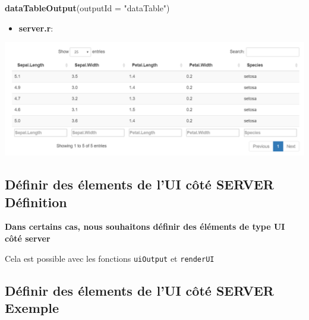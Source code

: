 \documentclass[
]{article}
\newenvironment{Shaded}{\begin{snugshade}}{\end{snugshade}}
\newcommand{\AttributeTok}[1]{\textcolor[rgb]{0.13,0.29,0.53}{#1}}
\newcommand{\FunctionTok}[1]{\textcolor[rgb]{0.13,0.29,0.53}{\textbf{#1}}}
\newcommand{\NormalTok}[1]{#1}
\newcommand{\OtherTok}[1]{\textcolor[rgb]{0.56,0.35,0.01}{#1}}
\newcommand{\SpecialCharTok}[1]{\textcolor[rgb]{0.81,0.36,0.00}{\textbf{#1}}}
\newcommand{\StringTok}[1]{\textcolor[rgb]{0.31,0.60,0.02}{#1}}
\providecommand{\tightlist}{%
  \setlength{\itemsep}{0pt}\setlength{\parskip}{0pt}}
\begin{document}
\begin{Shaded}
\begin{Highlighting}[]
\FunctionTok{dataTableOutput}\NormalTok{(}\AttributeTok{outputId =} \StringTok{"dataTable"}\NormalTok{)}
\end{Highlighting}
\end{Shaded}

\begin{itemize}
\tightlist
\item
  \textbf{server.r}:
\end{itemize}

\begin{Shaded}
\end{Shaded}

\includegraphics{img/odatable.png}

\hypertarget{duxe9finir-des-uxe9lements-de-lui-cuxf4tuxe9-server-duxe9finition}{%
\subsection{Définir des élements de l'UI côté SERVER \textbar{}
Définition}\label{duxe9finir-des-uxe9lements-de-lui-cuxf4tuxe9-server-duxe9finition}}

\textbf{Dans certains cas, nous souhaitons définir des éléments de type
UI côté server}

Cela est possible avec les fonctions \texttt{uiOutput} et
\texttt{renderUI}

\hypertarget{duxe9finir-des-uxe9lements-de-lui-cuxf4tuxe9-server-exemple}{%
\subsection{Définir des élements de l'UI côté SERVER \textbar{}
Exemple}\label{duxe9finir-des-uxe9lements-de-lui-cuxf4tuxe9-server-exemple}}
\end{document}
